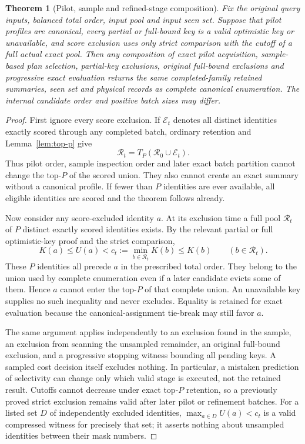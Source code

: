 \documentclass[11pt]{article}
\newtheorem{theorem}{Theorem}
\begin{document}
\begin{theorem}[Pilot, sample and refined-stage composition]\label{thm:aggregate-pilot-composition}
Fix the original query inputs, balanced total order, input pool and input seen set. Suppose that pilot profiles are canonical, every partial or full-bound key is a valid optimistic key or unavailable, and score exclusion uses only strict comparison with the cutoff of a full actual exact pool. Then any composition of exact pilot acquisition, sample-based plan selection, partial-key exclusions, original full-bound exclusions and progressive exact evaluation returns the same completed-family retained summaries, seen set and physical records as complete canonical enumeration. The internal candidate order and positive batch sizes may differ.
\end{theorem}
\begin{proof}
First ignore every score exclusion. If $\mathcal E_t$ denotes all distinct identities exactly scored through any completed batch, ordinary retention and Lemma~\ref{lem:top-p} give
\begin{equation}
\mathcal R_t=T_P(\mathcal R_0\cup\mathcal E_t).
\label{eq:aggregate-pilot-pool}
\end{equation}
Thus pilot order, sample inspection order and later exact batch partition cannot change the top-$P$ of the scored union. They also cannot create an exact summary without a canonical profile. If fewer than $P$ identities are ever available, all eligible identities are scored and the theorem follows already.

Now consider any score-excluded identity $a$. At its exclusion time a full pool $\mathcal R_t$ of $P$ distinct exactly scored identities exists. By the relevant partial or full optimistic-key proof and the strict comparison,
\begin{equation}
K(a)\le U(a)<c_t:=\min_{b\in\mathcal R_t}K(b)\le K(b)\qquad(b\in\mathcal R_t).
\label{eq:aggregate-strict-exclusion}
\end{equation}
These $P$ identities all precede $a$ in the prescribed total order. They belong to the union used by complete enumeration even if a later candidate evicts some of them. Hence $a$ cannot enter the top-$P$ of that complete union. An unavailable key supplies no such inequality and never excludes. Equality is retained for exact evaluation because the canonical-assignment tie-break may still favor $a$.

The same argument applies independently to an exclusion found in the sample, an exclusion from scanning the unsampled remainder, an original full-bound exclusion, and a progressive stopping witness bounding all pending keys. A sampled cost decision itself excludes nothing. In particular, a mistaken prediction of selectivity can change only which valid stage is executed, not the retained result. Cutoffs cannot decrease under exact top-$P$ retention, so a previously proved strict exclusion remains valid after later pilot or refinement batches. For a listed set $D$ of independently excluded identities, $\max_{a\in D}U(a)<c_t$ is a valid compressed witness for precisely that set; it asserts nothing about unsampled identities between their mask numbers.


\end{proof}
\end{document}

